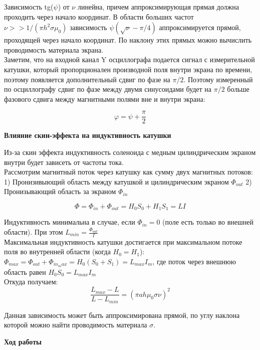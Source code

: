 \documentclass[a4paper,12pt]{article}
\begin{document}
Зависимость tg($\psi$) от $\nu$ линейна, причем аппроксимирующая прямая должна проходить через начало координат. В области больших частот $\nu >> 1/(\pi h^2 \sigma {\mu}_0)$ зависимость $\psi(\sqrt{\nu}-\pi/4)$ аппроксимируется прямой, проходящей через начало координат. По наклону этих прямых можно вычислить проводимость материала экрана. \\

Заметим, что на входной канал Y осциллографа подается сигнал с измерительной катушки, который пропорционален производной поля внутри экрана по времени, поэтому появляется дополнительный сдвиг по фазе на $\pi/2$. Поэтому измеренный по осциллографу сдвиг по фазе между двумя синусоидами будет на $\pi/2$ больше фазового сдвига между магнитными полями вне и внутри экрана: 

$$\varphi = \psi + \frac{\pi}{2}$$

\par\textbf{Влияние скин-эффекта на индуктивность катушки}

Из-за скин эффекта индуктивность соленоида с медным цилиндрическим экраном внутри будет зависеть от частоты тока. \\
Рассмотрим магнитный поток через катушку как сумму двух магнитных потоков: \\
1) Пронизивыющий область между катушкой и цилиндрическим экраном ${\Phi}_{out}$
2) Пронизывающий область за экраном ${\Phi}_{in}$

$$\Phi = {\Phi}_{in} + {\Phi}_{out} = H_0 S_0 + H_1 S_1 = LI$$

Индуктивность минимальна в случае, если ${\Phi}_{in} = 0$ (поле есть только во внешней области). При этом $L_{min} = \frac{{\Phi}_{out}}{I}$\\
Максимальная индуктивность катушки достигается при максимальном потоке поля во внутренней области (когда $H_0 = H_1$):\\
${\Phi}_{max} = {\Phi}_{out} + {\Phi}_{in_max} = H_0(S_0 + S_1) = L_{max}I_m$, где поток через внешнюю область равен $H_0 S_0 = L_{max}I_m$\\
Откуда получаем: \\

$$\frac{L_{max}-L}{L-L_{min}} = {(\pi ah {\mu}_0 \sigma \nu)}^2$$

Данная зависимость может быть аппроксимирована прямой, по углу наклона которой можно найти проводимость материала $\sigma$.

\par\textbf{Ход работы}
\end{document}
